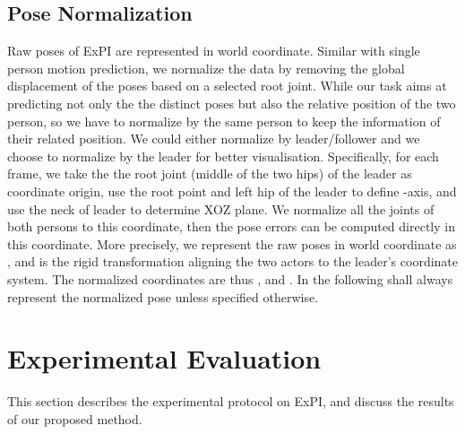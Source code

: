 \subsection{Pose Normalization}
\label{sec:norm}
Raw poses of ExPI are represented in world coordinate. Similar with single person motion prediction, we normalize the data by removing the global displacement of the poses based on a selected root joint.
While our task aims at predicting not only the the distinct poses but also the relative position of the two person, so 
we have to normalize by the same person to keep the information of their related position. We could either normalize by leader/follower and we choose to normalize by the leader for better visualisation.
Specifically, for each frame, we take the the root joint (middle of the two hips) of the leader as coordinate origin, use the root point and left hip of the leader to define -axis, and use the neck of leader to determine XOZ plane. We normalize all the joints of both persons to this coordinate, then the pose errors can be computed directly in this coordinate. More precisely,
we represent the raw poses in world coordinate as , and  is the rigid transformation aligning the two actors to the leader's coordinate system. The normalized coordinates are thus  ,  and . In the following  shall always represent the normalized pose unless specified otherwise.

\vspace{-2mm}
\section{Experimental Evaluation}
This section describes the experimental protocol on ExPI, and discuss the results of our proposed method.

